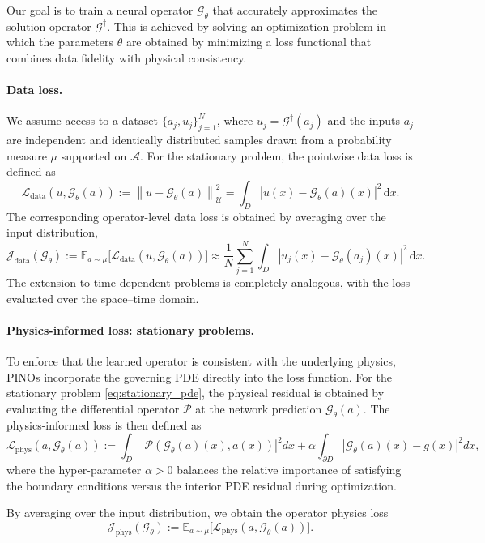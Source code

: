 \documentclass[final,1p,times]{elsarticle}
\theoremstyle{definition}
\newcommand{\norm}[1]{\left\lVert #1 \right\rVert}
\newcommand{\abs}[1]{\left| #1 \right|}
\newcommand{\E}{\mathbb{E}}
\newcommand{\G}{\mathcal{G}}
\newcommand{\Gt}{\mathcal{G}_{\theta}}
\renewcommand{\P}{\mathcal{P}}
\newcommand{\A}{\mathcal{A}}
\newcommand{\U}{\mathcal{U}}
\newcommand{\Ldata}{\mathcal{L}_{\mathrm{data}}}
\newcommand{\Lphys}{\mathcal{L}_{\mathrm{phys}}}
\newcommand{\Jdata}{\mathcal{J}_{\mathrm{data}}}
\newcommand{\Jphys}{\mathcal{J}_{\mathrm{phys}}}
\begin{document}
Our goal is to train a neural operator $\Gt$ that accurately approximates the solution operator $\G^\dagger$.
This is achieved by solving an optimization problem in which the parameters $\theta$ are obtained by minimizing a loss functional that combines data fidelity with physical consistency.

\paragraph{Data loss.}
We assume access to a dataset $\{a_j, u_j\}_{j=1}^N$, where $u_j = \G^\dagger(a_j)$ and the inputs $a_j$ are independent and identically distributed samples drawn from a probability measure $\mu$ supported on $\A$.
For the stationary problem, the pointwise data loss is defined as
\begin{equation}
    \Ldata(u, \Gt(a))
    := \norm{u - \Gt(a)}_{\U}^2
    = \int_D \abs{u(x) - \Gt(a)(x)}^2 \, \mathrm{d}x .
\end{equation}
The corresponding operator-level data loss is obtained by averaging over the input distribution,
\begin{equation}
    \Jdata(\Gt)
    := \E_{a \sim \mu} \big[ \Ldata(u, \Gt(a)) \big]
    \approx \frac{1}{N} \sum_{j=1}^N \int_D 
    \abs{u_j(x) - \Gt(a_j)(x)}^2 \, \mathrm{d}x .
\end{equation}
The extension to time-dependent problems is completely analogous, with the loss evaluated over the space--time domain.

\paragraph{Physics-informed loss: stationary problems.}
To enforce that the learned operator is consistent with the underlying physics, PINOs incorporate the governing PDE directly into the loss function.
For the stationary problem \eqref{eq:stationary_pde}, the physical residual is obtained by evaluating the differential operator $\P$ at the network prediction $\Gt(a)$.
The physics-informed loss is then defined as
\begin{equation}
    \Lphys(a,\Gt(a)) := \int_D |\P(\Gt(a)(x),a(x))|^2dx+
            \alpha \int_{\partial D}|\Gt(a)(x)-g(x)|^2dx ,
\end{equation}
where the hyper-parameter $\alpha>0$ balances the relative importance of satisfying the boundary conditions versus the interior PDE residual during optimization. 

By averaging over the input distribution, we obtain the operator physics loss
\begin{equation}
    \Jphys(\Gt)
    := \E_{a \sim \mu} \big[ \Lphys(a, \Gt(a)) \big] .
\end{equation}
\end{document}
